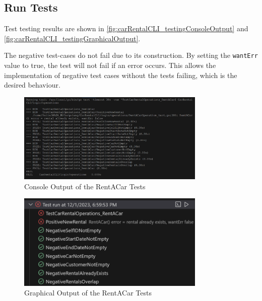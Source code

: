 \subsection*{Run Tests}
Test testing results are shown in \autoref{fig:carRentalCLI_testingConsoleOutput} and \autoref{fig:carRentalCLI_testingGraphicalOutput}.

The negative test-cases do not fail due to its construction.
By setting the \texttt{wantErr} value to true, the test will not fail if an error occurs.
This allows the implementation of negative test cases without the tests failing, which is the desired behaviour.

\begin{figure}
      \centering
      \includegraphics[width=0.8\textwidth]{figures/goLang/carRental/carRentalCLI/carRentalCLI_testingConsoleOutput.png}
      \caption{Console Output of the RentACar Tests}
      \label{fig:carRentalCLI_testingConsoleOutput}
\end{figure}
\begin{figure}
      \centering
      \includegraphics[width=0.8\textwidth]{figures/goLang/carRental/carRentalCLI/carRentalCLI_testingGraphicalOutput.png}
      \caption{Graphical Output of the RentACar Tests}
      \label{fig:carRentalCLI_testingGraphicalOutput}
\end{figure}



